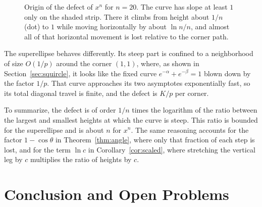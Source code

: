 \documentclass[journal]{IEEEtran}
\begin{document}
\begin{figure}[!t]
\centering
{}
\caption{Origin of the defect of $x^n$ for $n=20$. The curve has slope at least $1$ only on
the shaded strip. There it climbs from height about $1/n$ (dot) to $1$ while moving horizontally
by about $\ln n/n$, and almost all of that horizontal movement is lost relative to the corner
path.}
\label{fig:steep}
\end{figure}

The superellipse behaves differently. Its steep part is confined to a neighborhood of size
$O(1/p)$ around the corner $(1,1)$, where, as shown in Section~\ref{sec:squircle}, it looks like
the fixed curve $e^{-\alpha}+e^{-\beta}=1$ blown down by the factor $1/p$. That curve approaches
its two asymptotes exponentially fast, so its total diagonal travel is finite, and the
defect is $K/p$ per corner.

To summarize, the defect is of order $1/n$ times the logarithm of the ratio between the largest
and smallest heights at which the curve is steep. This ratio is bounded for the superellipse and
is about $n$ for $x^n$. The same reasoning accounts for the factor $1-\cos\theta$ in
Theorem~\ref{thm:angle}, where only that fraction of each step is lost, and for the term
$\ln c$ in Corollary~\ref{cor:scaled}, where stretching the vertical leg by $c$ multiplies
the ratio of heights by $c$.

\section{Conclusion and Open Problems}\label{sec:conclusion}
\end{document}
